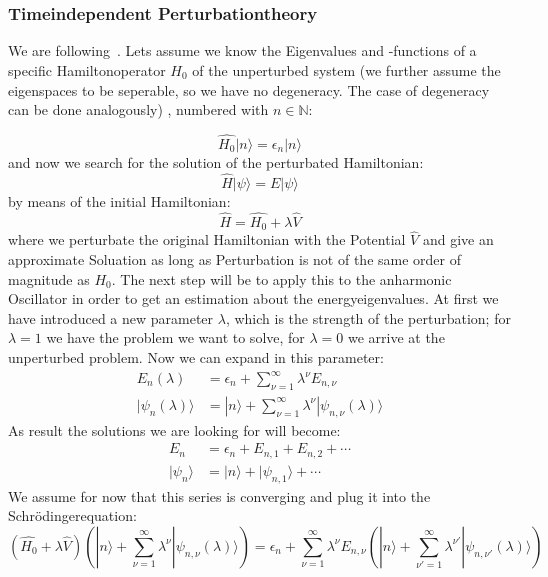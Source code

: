 \subsubsection{Timeindependent Perturbationtheory}
We are following~\cite{fliessbach2008quantenmechanik}.
Lets assume we know the Eigenvalues and -functions of a specific
Hamiltonoperator $\hat{H_0}$ of the
unperturbed system (we further assume the eigenspaces to be
seperable, so we have no degeneracy. The case of degeneracy
can be done analogously) 
, numbered with $n\in \mathbb{N}$:

\begin{equation}
\hat{H_0} |n\rangle = \epsilon_n |n\rangle 
\end{equation}
and now we search for the solution of the perturbated Hamiltonian:
\begin{equation}
    \hat{H}|\psi \rangle = E|\psi \rangle 
\end{equation}
by means of the initial Hamiltonian:
\begin{equation}
    \hat{H} = \hat{H_0} + \lambda \hat{V}
\end{equation}
where we perturbate the original Hamiltonian with the Potential
$\hat{V}$ and give an approximate Soluation as long as Perturbation
is not of the same order of magnitude as $H_0$. 
The next step will be to apply this to the anharmonic 
Oscillator in order to get an estimation about the energyeigenvalues.
At first we have introduced a new parameter $\lambda$, which is the 
strength of the perturbation; for $\lambda = 1$ we have the problem
we want to solve, for $\lambda = 0 $ we arrive at the unperturbed
problem. Now we can expand in this parameter:
\begin{align}
    E_n(\lambda) &= \epsilon_n + \sum_{\nu =1}^{\infty} \lambda^\nu
    E_{n,\nu} \\ 
    |\psi_n(\lambda)\rangle &=
    |n\rangle + \sum_{\nu =1}^{\infty} \lambda^\nu
    |\psi_{n,\nu}(\lambda)\rangle
\end{align}
As result the solutions we are looking for will become:
\begin{align}
    E_n &= \epsilon_n + E_{n,1} + E_{n,2} + \cdots\\ 
    |\psi_n \rangle &= |n\rangle + |\psi_{n,1} \rangle + \cdots 
\end{align}
We assume for now that this series is converging and plug it into
the Schrödingerequation:
\begin{equation}
    (\hat{H_0} + \lambda \hat{V})
   \left( |n\rangle + \sum_{\nu =1}^{\infty} \lambda^\nu
        |\psi_{n,\nu}(\lambda)\rangle \right) =
\epsilon_n + \sum_{\nu =1}^{\infty} \lambda^\nu
    E_{n,\nu}  
    \left( |n\rangle + \sum_{\nu' =1}^{\infty} \lambda^{\nu'}
        |\psi_{n,\nu'}(\lambda)\rangle \right) 
\end{equation}
